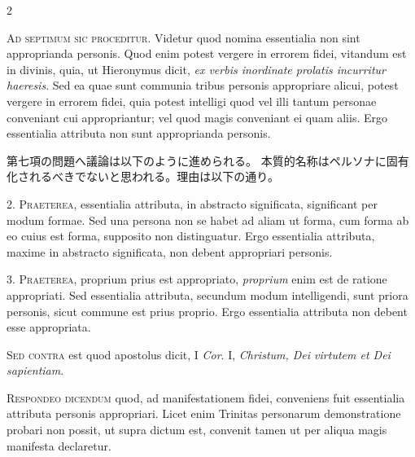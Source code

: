 \documentclass[paper=a4paper,fontsize=10pt,jafontsize=9pt,titlepage]{jlreq}
\begin{document}
\begin{paracol}{2}

\textsc{Ad septimum sic proceditur}. Videtur quod nomina essentialia non sint
    approprianda personis. Quod enim potest vergere in errorem fidei, vitandum
    est in divinis, quia, ut Hieronymus dicit, \textit{ex verbis inordinate prolatis
    incurritur haeresis}. Sed ea quae sunt communia tribus personis appropriare
    alicui, potest vergere in errorem fidei, quia potest intelligi quod vel
    illi tantum personae conveniant cui appropriantur; vel quod magis
    conveniant ei quam aliis. Ergo essentialia attributa non sunt approprianda
    personis.

\switchcolumn

第七項の問題へ議論は以下のように進められる。
本質的名称はペルソナに固有化されるべきでないと思われる。理由は以下の通り。

\switchcolumn*

2. \textsc{Praeterea}, essentialia attributa, in abstracto significata, significant per
modum formae. Sed una persona non se habet ad aliam ut forma, cum forma ab eo
cuius est forma, supposito non distinguatur. Ergo essentialia attributa, maxime
in abstracto significata, non debent appropriari personis.

\switchcolumn


\switchcolumn*

3. \textsc{Praeterea}, proprium prius est appropriato, \textit{proprium} enim est de ratione
appropriati. Sed essentialia attributa, secundum modum intelligendi, sunt
priora personis, sicut commune est prius proprio. Ergo essentialia attributa
non debent esse appropriata.

\switchcolumn


\switchcolumn*

\textsc{Sed contra} est quod apostolus dicit, I \textit{Cor}. I, \textit{Christum, Dei virtutem et Dei
sapientiam}.

\switchcolumn


\switchcolumn*

\textsc{Respondeo dicendum} quod, ad manifestationem fidei, conveniens fuit essentialia
attributa personis appropriari. Licet enim Trinitas personarum demonstratione
probari non possit, ut supra dictum est, convenit tamen ut per aliqua magis
manifesta declaretur.


\end{paracol}
\end{document}

